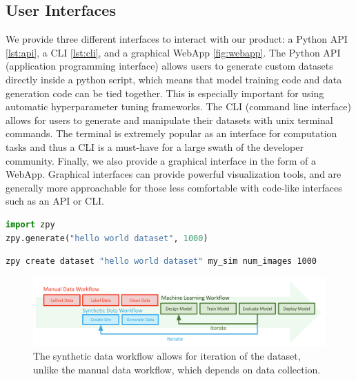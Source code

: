 \documentclass{article}
\begin{document}
\subsection{User Interfaces}
\label{sec:userinterfaces}

We provide three different interfaces to interact with our product: a Python API \ref{lst:api}, a CLI \ref{lst:cli}, and a graphical WebApp \ref{fig:webapp}. The Python API (application programming interface) allows users to generate custom datasets directly inside a python script, which means that model training code and data generation code can be tied together. This is especially important for using automatic hyperparameter tuning frameworks. The CLI (command line interface) allows for users to generate and manipulate their datasets with unix terminal commands. The terminal is extremely popular as an interface for computation tasks and thus a CLI is a must-have for a large swath of the developer community. Finally, we also provide a graphical interface in the form of a WebApp. Graphical interfaces can provide powerful visualization tools, and are generally more approachable for those less comfortable with code-like interfaces such as an API or CLI. 

\begin{lstlisting}[language=Python,caption={Generating a dataset of 1000 images using the zpy python API.},label={lst:api}]
import zpy
zpy.generate("hello world dataset", 1000)
\end{lstlisting}

\begin{lstlisting}[language=bash,caption={Generating a dataset of 1000 images using the zpy CLI},label={lst:cli}]
zpy create dataset "hello world dataset" my_sim num_images 1000
\end{lstlisting}

\begin{figure}
	\centering
	\includegraphics[width=\textwidth]{workflow.png}
	\caption{The synthetic data workflow allows for iteration of the dataset, unlike the manual data workflow, which depends on data collection.}
	\label{fig:workflow}
\end{figure}
\end{document}
